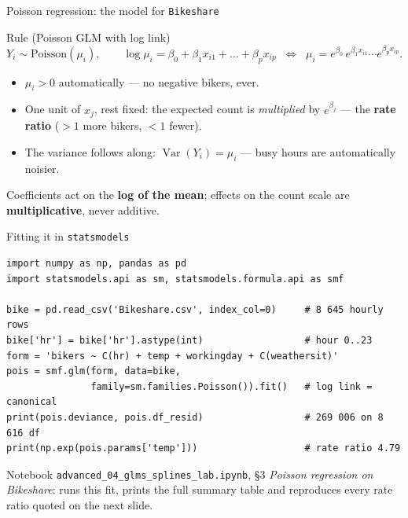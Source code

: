 \documentclass[aspectratio=169,11pt]{beamer}
\begin{document}
\begin{frame}{Poisson regression: the model for \texttt{Bikeshare}}
  \begin{block}{Rule (Poisson GLM with log link)}
    \[
      Y_i \sim \text{Poisson}(\mu_i), \qquad
      \log \mu_i = \beta_0 + \beta_1 x_{i1} + \dots + \beta_p x_{ip}
      \;\;\Longleftrightarrow\;\;
      \mu_i = e^{\beta_0}\, e^{\beta_1 x_{i1}} \cdots e^{\beta_p x_{ip}} .
    \]
  \end{block}
  \begin{readme}
    \begin{itemize}
      \item $\mu_i > 0$ automatically --- no negative bikers, ever.
      \item One unit of $x_j$, rest fixed: the expected count is \emph{multiplied} by
            $e^{\beta_j}$ --- the \textbf{rate ratio} ($>1$ more bikers, $<1$ fewer).
      \item The variance follows along: $\operatorname{Var}(Y_i)=\mu_i$ --- busy hours
            are automatically noisier.
    \end{itemize}
  \end{readme}
  \begin{takeaway}
    Coefficients act on the \textbf{log of the mean}; effects on the count scale are
    \textbf{multiplicative}, never additive.
  \end{takeaway}
\end{frame}

\begin{frame}[fragile]{Fitting it in \texttt{statsmodels}}
\begin{lstlisting}
import numpy as np, pandas as pd
import statsmodels.api as sm, statsmodels.formula.api as smf

bike = pd.read_csv('Bikeshare.csv', index_col=0)     # 8 645 hourly rows
bike['hr'] = bike['hr'].astype(int)                  # hour 0..23
form = 'bikers ~ C(hr) + temp + workingday + C(weathersit)'
pois = smf.glm(form, data=bike,
               family=sm.families.Poisson()).fit()   # log link = canonical
print(pois.deviance, pois.df_resid)                  # 269 006 on 8 616 df
print(np.exp(pois.params['temp']))                   # rate ratio 4.79
\end{lstlisting}
  \begin{labnote}
    Notebook \texttt{advanced\_04\_glms\_splines\_lab.ipynb}, \S 3 \emph{Poisson
    regression on Bikeshare}: runs this fit, prints the full summary table and
    reproduces every rate ratio quoted on the next slide.
  \end{labnote}
\end{frame}
\end{document}
